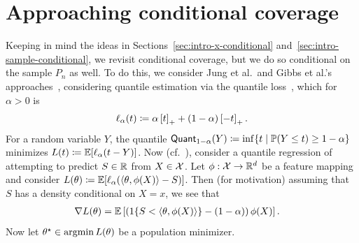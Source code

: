 \documentclass{article}
\newcommand{\loss}{\ell}
\newcommand{\poploss}{L}
\newcommand{\scorerv}{S}
\newcommand{\quant}{\mathsf{Quant}}
\begin{document}
\section{Approaching conditional coverage}
\label{sec:approaching-conditional}

Keeping in mind the ideas in Sections~\ref{sec:intro-x-conditional}
and~\ref{sec:intro-sample-conditional}, we revisit conditional coverage,
but we do so conditional on the sample $P_n$ as well.
%
To do this, we consider Jung et al.\ and Gibbs et al.'s
approaches~\citep{JungNoRaRo23,GibbsChCa25}, considering
quantile estimation via the quantile loss~\citep{KoenkerBa78},
which for $\alpha > 0$ is
\begin{equation*}
  \loss_\alpha(t) \defeq \alpha \hinge{t} + (1 - \alpha) \hinge{-t}.
\end{equation*}
For a random variable $Y$, the quantile $\quant_{1 -
  \alpha}(Y) \defeq \inf\{t \mid \P(Y \le t) \ge 1 - \alpha\}$ minimizes
$\poploss(t) \defeq \E[\loss_\alpha(t - Y)]$.
%
%
Now (cf.~\cite{GibbsChCa25, JungNoRaRo23}), consider a
quantile regression of attempting to predict $\scorerv \in \R$ from $X \in
\mathcal{X}$.
%
Let $\phi : \mathcal{X} \to \mathbb{R}^d$ be a feature mapping and consider
$\poploss(\theta) \defeq \E[\loss_\alpha(\<\theta, \phi(X)\>
  - \scorerv)]$.
%
Then (for motivation) assuming that $\scorerv$ has a density
conditional on $X = x$, we see that
\begin{align*}
  \nabla \poploss(\theta)
  & = \E\left[\left(\indic{\scorerv < \<\theta, \phi(X)\>} - (1 - \alpha)\right)
    \phi(X) \right].
\end{align*}
Now let $\theta\opt \in \argmin \poploss(\theta)$ be a population minimizer.
\end{document}
